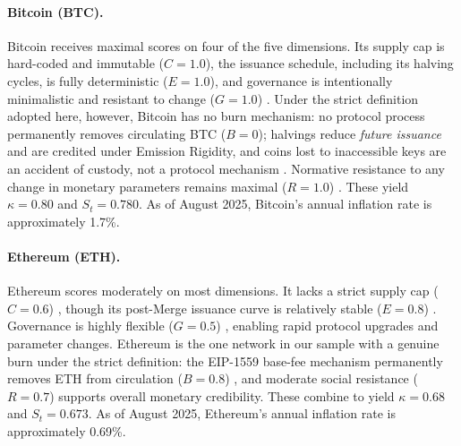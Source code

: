 \documentclass[12pt]{article}
\begin{document}
\paragraph{Bitcoin (BTC).}
Bitcoin receives maximal scores on four of the five dimensions. Its supply cap is hard-coded and immutable (\(C = 1.0\)), the issuance schedule, including its halving cycles, is fully deterministic (\(E = 1.0\)), and governance is intentionally minimalistic and resistant to change (\(G = 1.0\)) \citep{nakamoto2008bitcoin}. Under the strict definition adopted here, however, Bitcoin has no burn mechanism: no protocol process permanently removes circulating BTC (\(B = 0\)); halvings reduce \emph{future issuance} and are credited under Emission Rigidity, and coins lost to inaccessible keys are an accident of custody, not a protocol mechanism \citep{saleh2021blockchain}. Normative resistance to any change in monetary parameters remains maximal (\(R = 1.0\)) \citep{cong2021tokenomics}. These yield \( \kappa = 0.80 \) and \( S_t = 0.780 \). As of August 2025, Bitcoin's annual inflation rate is approximately 1.7\%.

\paragraph{Ethereum (ETH).}
Ethereum scores moderately on most dimensions. It lacks a strict supply cap (\(C = 0.6\)) \citep{ethereumSupplyFAQ}, though its post-Merge issuance curve is relatively stable (\(E = 0.8\)) \citep{buterin2022proof}. Governance is highly flexible (\(G = 0.5\)) \citep{buterin2014ethereum}, enabling rapid protocol upgrades and parameter changes. Ethereum is the one network in our sample with a genuine burn under the strict definition: the EIP-1559 base-fee mechanism permanently removes ETH from circulation (\(B = 0.8\)) \citep{eip1559stats}, and moderate social resistance (\(R = 0.7\)) supports overall monetary credibility. These combine to yield \( \kappa = 0.68 \) and \( S_t = 0.673 \). As of August 2025, Ethereum's annual inflation rate is approximately 0.69\%.
\end{document}
